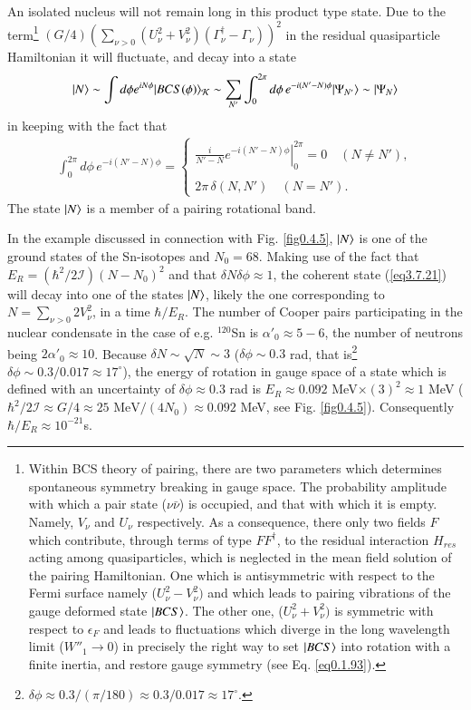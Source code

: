 An isolated nucleus will not remain long in this product type state. Due to the term\footnote{Within BCS theory of pairing, there are two parameters which determines spontaneous symmetry breaking in gauge space. The probability amplitude with which a pair state ($\nu\bar{\nu}$) is occupied, and that with which it is empty. Namely, $V_\nu$ and $U_\nu$ respectively. As a consequence, there only two fields $F$ which contribute, through terms of type $FF^\dagger$, to the residual interaction $H_{res}$ acting among quasiparticles, which is neglected in the mean field solution of the pairing Hamiltonian. One which is antisymmetric with respect to the Fermi surface namely ($U^2_\nu-V^2_\nu)$ and which leads to pairing vibrations of the gauge deformed state $|{BCS} \rangle$. The other one, ($U^2_\nu+V^2_\nu)$ is symmetric with respect to $\epsilon_F$ and leads to fluctuations which diverge in the long wavelength limit ($W''_1\to0$) in precisely the right way to set $|{BCS} \rangle$ into rotation with a finite inertia, and restore gauge symmetry (see Eq. \ref{eq0.1.93}).}  $(G/4)\left(\sum_{\nu>0}\left(U^2_\nu+V^2_\nu\right)\left(\Gamma_\nu^\dagger-\Gamma_\nu\right)\right)^2$ in the residual quasiparticle Hamiltonian it will fluctuate, and decay into a state
\begin{align}\label{eqbeta}
|N\rangle \sim \int d\phi e^{iN\phi}|BCS(\phi)\rangle_{\mathcal{K}}\sim \sum_{N'}\int_0^{2\pi}d\phi\, e^{-i(N'-N)\phi}|{\Psi_{N'}} \rangle\sim|{\Psi_{N}} \rangle
\end{align}
in keeping with the fact that
\begin{align}\label{eq3.7.27}
\int_0^{2\pi}d\phi\, e^{-i(N'-N)\phi}=\left\{
\begin{array}{l}
\left.\frac{i}{N'-N}e^{-i(N'-N)\phi}\right|^{2\pi}_0=0\quad (N\neq N'),\\ 
 \\
 2\pi\,\delta(N,N')\quad (N= N').
\end{array} \right.
\end{align}
The state $|{N} \rangle$ is a member of a pairing rotational band.  

In the example discussed in connection with Fig.  \ref{fig0.4.5}, $|{N} \rangle$ is one of the ground states of the Sn-isotopes and $N_0=68$. Making use of the fact that $E_R=\left(\hbar^2/2\mathcal I\right)(N-N_0)^2$ and that $\delta N\delta\phi\approx1$, the coherent state (\ref{eq3.7.21}) will decay into one of the states $|{N} \rangle$, likely the one corresponding to $N=\sum_{\nu>0}2V_\nu^2$, in a time $\hbar/E_R$. The number of  Cooper pairs participating in the nuclear condensate in the case of e.g. $^{120}$Sn is $\alpha'_0\approx5-6$, the number of neutrons being $2\alpha'_0\approx10$. Because $\delta N\sim\sqrt{N}\sim3$ ($\delta\phi\sim0.3$ rad, that is\footnote{$\delta\phi\approx0.3/(\pi/180)\approx0.3/0.017\approx17^\circ$.} $\delta\phi\sim0.3/0.017\approx 17^\circ$), the energy of rotation in gauge space of a state which is defined with an uncertainty of $\delta\phi\approx0.3$ rad is  $E_R\approx0.092$ MeV$\times(3)^2\approx 1$ MeV ($\hbar^2/2\mathcal I\approx G/4\approx 25\text{ MeV}/(4N_0)\approx0.092$ MeV, see Fig. \ref{fig0.4.5}). Consequently $\hbar/E_R\approx10^{-21}$s. 


